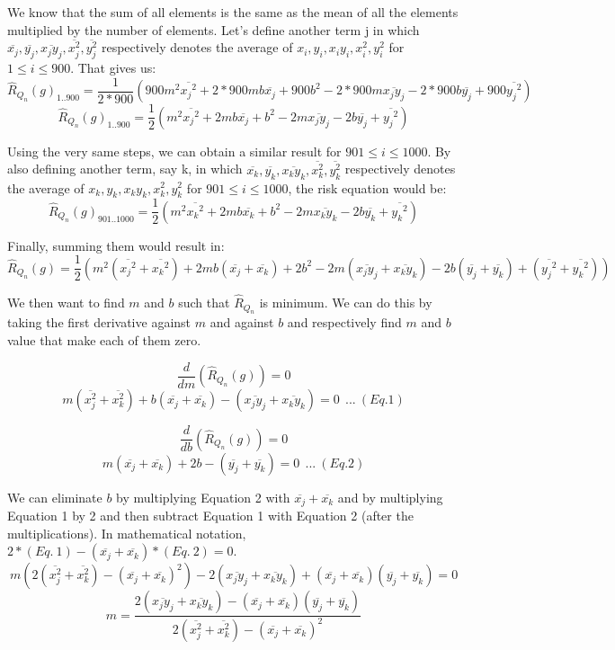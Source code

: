 \documentclass[twoside]{homework}
\begin{document}
\begin{itemize}
    We know that the sum of all elements is the same as the mean of all the elements multiplied by the number of elements. Let's define another term j in which $\overline{x_j}, \overline{y_j}, \overline{x_jy_j}, \overline{x_j^2}, \overline{y_j^2}$ respectively denotes the average of $x_i, y_i, x_iy_i, x_i^2, y_i^2$ for $1\leq{i}\leq{900}$. That gives us:
    $$\hat{R}_{Q_n}(g)_{{1..900}}=\frac{1}{2*900}(900m^2\overline{{x_j}^2}+2*900mb\overline{x_j}+900b^2-2*900m\overline{x_jy_j}-2*900b\overline{y_j}+900\overline{{y_j}^2})$$
    $$\hat{R}_{Q_n}(g)_{{1..900}}=\frac{1}{2}(m^2\overline{{x_j}^2}+2mb\overline{x_j}+b^2-2m\overline{x_jy_j}-2b\overline{y_j}+\overline{{y_j}^2})$$

    Using the very same steps, we can obtain a similar result for $901\leq{i}\leq{1000}$. By also defining another term, say k, in which $\overline{x_k}, \overline{y_k}, \overline{x_ky_k}, \overline{x_k^2}, \overline{y_k^2}$ respectively denotes the average of $x_k, y_k, x_ky_k, x_k^2, y_k^2$ for $901\leq{i}\leq{1000}$, the risk equation would be:
    $$\hat{R}_{Q_n}(g)_{{901..1000}}=\frac{1}{2}(m^2\overline{{x_k}^2}+2mb\overline{x_k}+b^2-2m\overline{x_ky_k}-2b\overline{y_k}+\overline{{y_k}^2})$$

    Finally, summing them would result in:
    $$\hat{R}_{Q_n}(g)=\frac{1}{2}(m^2(\overline{{x_j}^2}+\overline{{x_k}^2})+2mb(\overline{x_j}+\overline{x_k})+2b^2-2m(\overline{x_jy_j}+\overline{x_ky_k})-2b(\overline{y_j}+\overline{y_k})+(\overline{{y_j}^2}+\overline{{y_k}^2}))$$

    We then want to find $m$ and $b$ such that $\hat{R}_{Q_n}$ is minimum. We can do this by taking the first derivative against $m$ and against $b$ and respectively find $m$ and $b$ value that make each of them zero.

    $$\frac{d}{dm}(\hat{R}_{Q_n}(g))=0$$
    $$m(\overline{x_j^2}+\overline{x_k^2})+b(\overline{x_j}+\overline{x_k})-(\overline{x_jy_j}+\overline{x_ky_k})=0\:\:...\:(Eq. 1)$$

    $$\frac{d}{db}(\hat{R}_{Q_n}(g))=0$$
    $$m(\overline{x_j}+\overline{x_k})+2b-(\overline{y_j}+\overline{y_k})=0\:\:...\:(Eq. 2)$$

    We can eliminate $b$ by multiplying Equation 2 with $\overline{x_j}+\overline{x_k}$ and by multiplying Equation 1 by 2 and then subtract Equation 1 with Equation 2 (after the multiplications). In mathematical notation, $2*(Eq.\:1)-(\overline{x_j}+\overline{x_k})*(Eq.\:2)=0$.
    $$m(2(\overline{x_j^2}+\overline{x_k^2})-(\overline{x_j}+\overline{x_k})^2)-2(\overline{x_jy_j}+\overline{x_ky_k})+(\overline{x_j}+\overline{x_k})(\overline{y_j}+\overline{y_k})=0$$
    $$m=\frac{2(\overline{x_jy_j}+\overline{x_ky_k})-(\overline{x_j}+\overline{x_k})(\overline{y_j}+\overline{y_k})}{2(\overline{x_j^2}+\overline{x_k^2})-(\overline{x_j}+\overline{x_k})^2}$$


\end{itemize}
\end{document}
